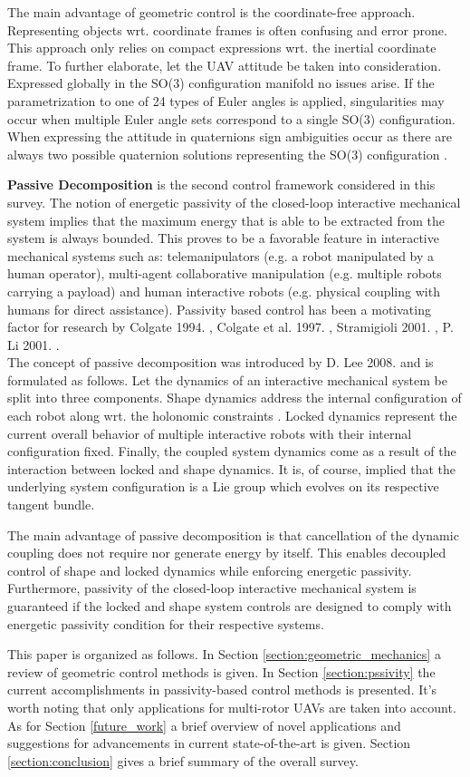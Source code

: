 The main advantage of geometric control is the coordinate-free approach. Representing objects wrt. coordinate frames is often confusing and error prone. This approach only relies on compact expressions wrt. the inertial coordinate frame. To further elaborate, let the UAV attitude be taken into consideration. Expressed globally in the SO(3) configuration manifold no issues arise. If the parametrization to one of 24 types of Euler angles is applied, singularities may occur when multiple Euler angle sets correspond to a single SO(3) configuration. When expressing the attitude in quaternions sign ambiguities occur as there are always two possible quaternion solutions representing the SO(3) configuration \cite{euler}.

\noindent \textbf{Passive Decomposition} is the second control framework considered in this survey. The notion of energetic passivity of the closed-loop interactive mechanical system implies that the maximum energy that is able to be extracted from the system is always bounded. This proves to be a favorable feature in interactive mechanical systems such as: telemanipulators (e.g. a robot manipulated by a human operator), multi-agent collaborative manipulation (e.g. multiple robots carrying a payload) and human interactive robots (e.g. physical coupling with humans for direct assistance). Passivity based control has been a motivating factor for research by  Colgate 1994. \cite{passive6}, Colgate et al. 1997. \cite{passive12}, Stramigioli 2001. \cite{passive5}, P. Li 2001. \cite{passive8}. \\
The concept of passive decomposition was introduced by D. Lee 2008. \cite{LeePassive} and is formulated as follows. Let the dynamics of an interactive mechanical system be split into three components. Shape dynamics address the internal configuration of each robot along wrt. the holonomic constraints \cite{holonomic}. Locked dynamics represent the current overall behavior of multiple interactive robots with their internal configuration fixed. Finally, the coupled system dynamics come as a result of the interaction between locked and shape dynamics. It is, of course, implied that the underlying system configuration is a Lie group which evolves on its respective tangent bundle.

The main advantage of passive decomposition is that cancellation of the dynamic coupling does not require nor generate energy by itself. This enables decoupled control of shape and locked dynamics while enforcing energetic passivity. Furthermore, passivity of the closed-loop interactive mechanical system is guaranteed if the locked and shape system controls are designed to comply with energetic passivity condition for their respective systems.

This paper is organized as follows. In Section \ref{section:geometric_mechanics} a review of geometric control methods is given. In Section \ref{section:pssivity} the current accomplishments in passivity-based control methods is presented. It's worth noting that only applications for multi-rotor UAVs are taken into account. As for Section  \ref{future_work} a brief overview of novel applications and suggestions for advancements in current state-of-the-art is given. Section \ref{section:conclusion} gives a brief summary of the overall survey.